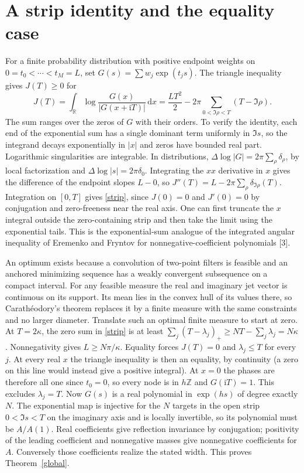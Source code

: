 \documentclass[11pt]{article}
\newcommand{\dd}{\mathrm d}
\newcommand{\ii}{\mathrm i}
\begin{document}
\section{A strip identity and the equality case}
For a finite probability distribution with positive endpoint weights on
$0=t_0<\cdots<t_M=L$, set $G(s)=\sum w_j\exp(t_js)$.
The triangle inequality gives $J(T)\ge0$ for
\begin{equation}\label{strip}
 J(T)=\int_{\mathbb R}\log\frac{G(x)}{|G(x+\ii T)|}\,\dd x
 =\frac{LT^2}{2}-2\pi\sum_{0<\Im\rho<T}(T-\Im\rho).
\end{equation}
The sum ranges over the zeros of $G$ with their orders. To verify the
identity, each end of the exponential sum has a single dominant term
uniformly in $\Im s$, so the integrand decays exponentially in $|x|$ and
zeros have bounded real part. Logarithmic singularities are integrable.
In distributions, $\Delta\log|G|=2\pi\sum_\rho\delta_\rho$, by local
factorization and $\Delta\log|s|=2\pi\delta_0$. Integrating the $xx$
derivative in $x$ gives the difference of the endpoint slopes $L-0$,
so $J''(T)=L-2\pi\sum_\rho\delta_{\Im\rho}(T)$.
Integration on $[0,T]$ gives \eqref{strip}, since $J(0)=0$ and
$J'(0)=0$ by conjugation and zero-freeness near the real axis.
One can first truncate the $x$ integral outside the zero-containing
strip and then take the limit using the exponential tails.
This is the exponential-sum analogue of the integrated angular inequality
of Eremenko and Fryntov for nonnegative-coefficient polynomials [3].

An optimum exists because a convolution of two-point filters is feasible and
an anchored minimizing sequence has a weakly convergent subsequence on a
compact interval. For any feasible measure the real and imaginary jet vector
is continuous on its support. Its mean lies in the convex hull of its
values there, so Carath\'eodory's theorem replaces it by a finite measure
with the same constraints and no larger diameter. Translate such an
optimal finite measure to start at zero. At $T=2\kappa$, the zero sum in
\eqref{strip} is at least
$\sum_j(T-\lambda_j)_+\ge NT-\sum_j\lambda_j=N\kappa$.
Nonnegativity gives $L\ge N\pi/\kappa$.
Equality forces $J(T)=0$ and $\lambda_j\le T$ for every $j$.
At every real $x$ the triangle inequality is then an equality, by
continuity (a zero on this line would instead give a positive integral).
At $x=0$ the phases are therefore all one since $t_0=0$, so every node is in
$h\mathbb Z$ and $G(\ii T)=1$. This excludes $\lambda_j=T$. Now $G(s)$ is
a real polynomial in $\exp(hs)$ of degree exactly $N$.
The exponential map is injective for the $N$ targets in the open strip
$0<\Im s<T$ on the imaginary axis and is locally invertible, so its
polynomial must be $A/A(1)$. Real coefficients give reflection
invariance by conjugation; positivity of the leading coefficient and
nonnegative masses give nonnegative coefficients for $A$.
Conversely those coefficients realize the stated width. This proves
Theorem~\ref{global}.
\end{document}
